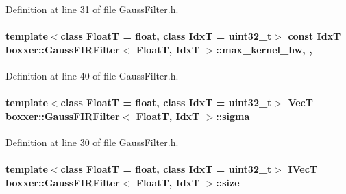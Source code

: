 Definition at line 31 of file Gauss\+Filter.\+h.

\paragraph[{\texorpdfstring{max\+\_\+kernel\+\_\+hw}{max_kernel_hw}}]{\setlength{\rightskip}{0pt plus 5cm}template$<$class FloatT = float, class IdxT = uint32\+\_\+t$>$ const IdxT {\bf boxxer\+::\+Gauss\+F\+I\+R\+Filter}$<$ FloatT, IdxT $>$\+::max\+\_\+kernel\+\_\+hw\hspace{0.3cm}{\ttfamily [static]}, {\ttfamily [protected]}, {\ttfamily [inherited]}}\hypertarget{classboxxer_1_1GaussFIRFilter_a7f85e018f78753ee4fedf65c04b0c65a}{}\label{classboxxer_1_1GaussFIRFilter_a7f85e018f78753ee4fedf65c04b0c65a}


Definition at line 40 of file Gauss\+Filter.\+h.

\paragraph[{\texorpdfstring{sigma}{sigma}}]{\setlength{\rightskip}{0pt plus 5cm}template$<$class FloatT = float, class IdxT = uint32\+\_\+t$>$ {\bf VecT} {\bf boxxer\+::\+Gauss\+F\+I\+R\+Filter}$<$ FloatT, IdxT $>$\+::sigma\hspace{0.3cm}{\ttfamily [inherited]}}\hypertarget{classboxxer_1_1GaussFIRFilter_a66ced06c688fd544d5f1f8be39aa2125}{}\label{classboxxer_1_1GaussFIRFilter_a66ced06c688fd544d5f1f8be39aa2125}


Definition at line 30 of file Gauss\+Filter.\+h.

\paragraph[{\texorpdfstring{size}{size}}]{\setlength{\rightskip}{0pt plus 5cm}template$<$class FloatT = float, class IdxT = uint32\+\_\+t$>$ {\bf I\+VecT} {\bf boxxer\+::\+Gauss\+F\+I\+R\+Filter}$<$ FloatT, IdxT $>$\+::size\hspace{0.3cm}{\ttfamily [inherited]}}\hypertarget{classboxxer_1_1GaussFIRFilter_ac0d4e19bb2be3e8913e77283e7e4317e}{}\label{classboxxer_1_1GaussFIRFilter_ac0d4e19bb2be3e8913e77283e7e4317e}



